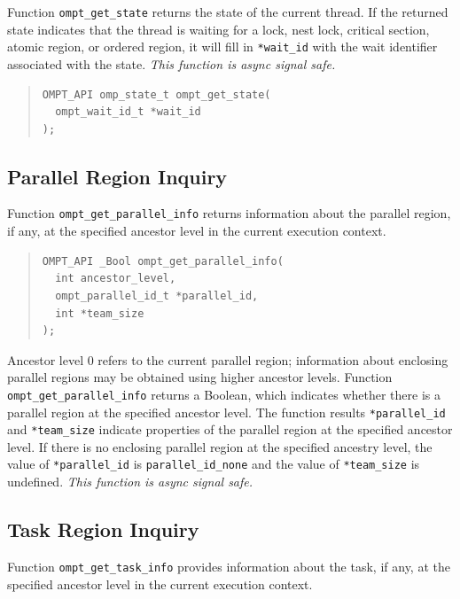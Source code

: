 \documentclass{article}
\begin{document}
Function \verb|ompt_get_state| returns the state of the 
current thread. If the returned state indicates that the thread is waiting for a lock, nest lock, critical section, atomic region, or ordered region, it will fill in \verb|*wait_id| with the wait identifier associated with the state.  {\em This function is async signal safe.}

\begin{quote}
\begin{verbatim}
OMPT_API omp_state_t ompt_get_state(
  ompt_wait_id_t *wait_id       
);
\end{verbatim}
\end{quote}
 
\subsection{Parallel Region Inquiry} 
\label{sec:parallel-inquiry} 
Function \verb|ompt_get_parallel_info| returns information about the parallel region, if any, at the specified ancestor level in the current execution context.

\begin{quote}
\begin{verbatim}
OMPT_API _Bool ompt_get_parallel_info(
  int ancestor_level,
  ompt_parallel_id_t *parallel_id, 
  int *team_size
);
\end{verbatim}
\end{quote}

\noindent 
Ancestor level 0 refers to the current parallel region; 
information about enclosing parallel regions may be obtained using higher ancestor levels. 
Function \verb|ompt_get_parallel_info| returns a Boolean, which indicates whether there is a parallel region at the specified ancestor level.
The function results \verb|*parallel_id| and \verb|*team_size| indicate properties of the parallel region at the specified ancestor level.
If there is no enclosing parallel region at the specified ancestry level, the value of \verb|*parallel_id| is \verb|parallel_id_none| and the value of \verb|*team_size| is undefined.
{\em This function is async signal safe.}
 
\subsection{Task Region Inquiry}
\label{sec:task-region}

Function \verb|ompt_get_task_info| provides information about the task, if any, at the specified ancestor level in the current execution context.
\end{document}
